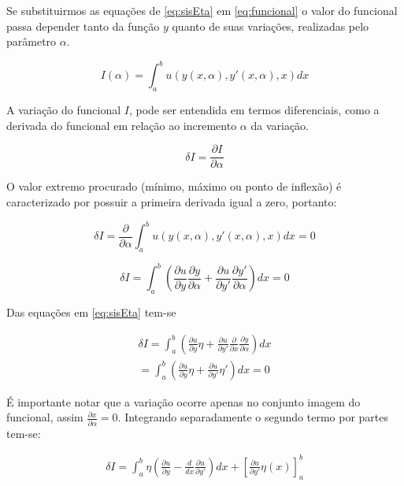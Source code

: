 Se substituirmos as equações de \ref{eq:sisEta} em \ref{eq:funcional} o valor do funcional passa depender tanto da função $ y $ quanto de suas variações, realizadas pelo parâmetro $ \alpha $.

\begin{equation}
\label{eq:funcionalVar}
I(\alpha) = \int_{a}^{b} u(y(x, \alpha), y'(x, \alpha), x) dx
\end{equation}

A variação do funcional $ I $, pode ser entendida em termos diferenciais, como a derivada do funcional em relação ao incremento $\alpha$ da variação.

\begin{equation}
\delta I = \frac{\partial I}{\partial \alpha}
\end{equation}

O valor extremo procurado (mínimo, máximo ou ponto de inflexão) é caracterizado por possuir a primeira derivada igual a zero, portanto:

\begin{equation}
\delta I = \frac{\partial}{\partial \alpha} \int_{a}^{b} u(y(x, \alpha), y'(x, \alpha), x) dx = 0
\end{equation}

\begin{equation}
\delta I = \int_{a}^{b} \left(\frac{\partial u}{\partial y} \frac{\partial y}{\partial \alpha} + \frac{\partial u}{\partial y'} \frac{\partial y'}{\partial \alpha}\right) dx = 0
\end{equation}

Das equações em \ref{eq:sisEta} tem-se 

\begin{equation}
\begin{split}
\delta I = \int_{a}^{b} \left(\frac{\partial u}{\partial y} \eta + \frac{\partial u}{\partial y'} \frac{\partial }{\partial x}
\frac{\partial y}{\partial \alpha}\right) dx \\
= \int_{a}^{b} \left(\frac{\partial u}{\partial y} \eta + \frac{\partial u}{\partial y'} \eta'
\right) dx = 0
\end{split}
\end{equation}

É importante notar que a variação ocorre apenas no conjunto imagem do funcional, assim $\frac{\partial{x}}{\partial{\alpha}} = 0$. Integrando separadamente o segundo termo por partes tem-se:

\begin{equation}
\begin{split}
\delta I = \int_{a}^{b} \eta \left(\frac{\partial u}{\partial y} - \frac{d}{dx} 
\frac{\partial u}{\partial y'}\right)  dx +
\left[\frac{\partial u}{\partial y'} \eta(x) \right]_a^b
\end{split}
\end{equation}

